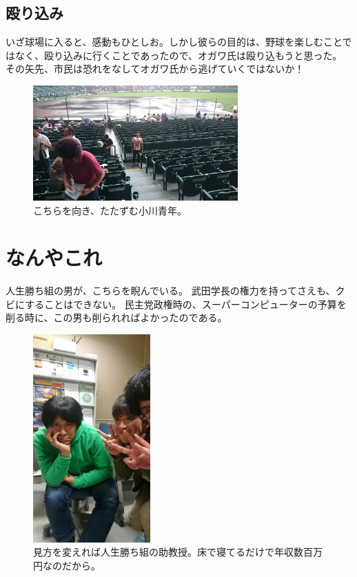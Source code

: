 \subsection{殴り込み}
いざ球場に入ると、感動もひとしお。しかし彼らの目的は、野球を楽しむことではなく、殴り込みに行くことであったので、オガワ氏は殴り込もうと思った。
その矢先、市民は恐れをなしてオガワ氏から逃げていくではないか！

\begin{figure}[h]
\centering
\includegraphics[width=0.7\textwidth]{./section/Shokuji/figures/Koushien_4.jpg}
  \caption{こちらを向き、たたずむ小川青年。}
\label{Fig:Seiza}
\end{figure}




\section{なんやこれ}
人生勝ち組の男が、こちらを睨んでいる。
武田学長の権力を持ってさえも、クビにすることはできない。
民主党政権時の、スーパーコンピューターの予算を削る時に、この男も削られればよかったのである。

\begin{figure}[h]
\centering
\includegraphics[width=0.4\textwidth]{./section/Shokuji/figures/Nanyakore.jpg}
  \caption{見方を変えれば人生勝ち組の助教授。床で寝てるだけで年収数百万円なのだから。}
\label{Fig:Seiza}
\end{figure}


